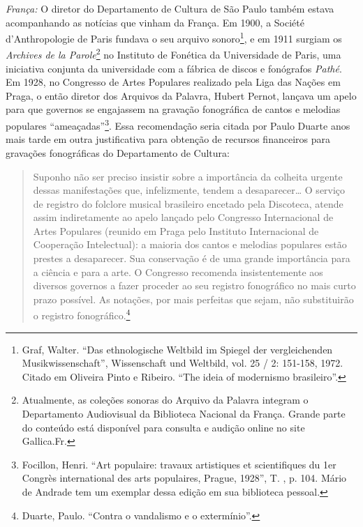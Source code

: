 \emph{França:} O diretor do Departamento de Cultura de São Paulo também
estava acompanhando as notícias que vinham da França. Em 1900, a Société
d'Anthropologie de Paris fundava o seu arquivo sonoro\footnote{Graf,
  Walter. ``Das ethnologische Weltbild im Spiegel der vergleichenden
  Musikwissenschaft'', Wissenschaft und Weltbild, vol. 25 / 2: 151-158,
  1972. Citado em Oliveira Pinto e Ribeiro. ``The ideia of modernismo
  brasileiro''.}, e em 1911 surgiam os \emph{Archives de la
Parole}\footnote{Atualmente, as coleções sonoras do Arquivo da Palavra
  integram o Departamento Audiovisual da Biblioteca Nacional da França.
  Grande parte do conteúdo está disponível para consulta e audição
  online no site Gallica.Fr.} no Instituto de Fonética da Universidade
de Paris, uma iniciativa conjunta da universidade com a fábrica de
discos e fonógrafos \emph{Pathé}. Em 1928, no Congresso de Artes
Populares realizado pela Liga das Nações em Praga, o então diretor dos
Arquivos da Palavra, Hubert Pernot, lançava um apelo para que governos
se engajassem na gravação fonográfica de cantos e melodias populares
``ameaçadas''\footnote{Focillon, Henri. ``Art populaire: travaux
  artistiques et scientifiques du 1er Congrès international des arts
  populaires, Prague, 1928'', T. , p. 104. Mário de Andrade tem um
  exemplar dessa edição em sua biblioteca pessoal.}. Essa recomendação
seria citada por Paulo Duarte anos mais tarde em outra justificativa
para obtenção de recursos financeiros para gravações fonográficas do
Departamento de Cultura:

\begin{quote}
Suponho não ser preciso insistir sobre a importância da colheita urgente
dessas manifestações que, infelizmente, tendem a desaparecer\ldots{} O
serviço de registro do folclore musical brasileiro encetado pela
Discoteca, atende assim indiretamente ao apelo lançado pelo Congresso
Internacional de Artes Populares (reunido em Praga pelo Instituto
Internacional de Cooperação Intelectual): a maioria dos cantos e
melodias populares estão prestes a desaparecer. Sua conservação é de uma
grande importância para a ciência e para a arte. O Congresso recomenda
insistentemente aos diversos governos a fazer proceder ao seu registro
fonográfico no mais curto prazo possível. As notações, por mais
perfeitas que sejam, não substituirão o registro fonográfico.\footnote{Duarte,
  Paulo. ``Contra o vandalismo e o extermínio''.}
\end{quote}

